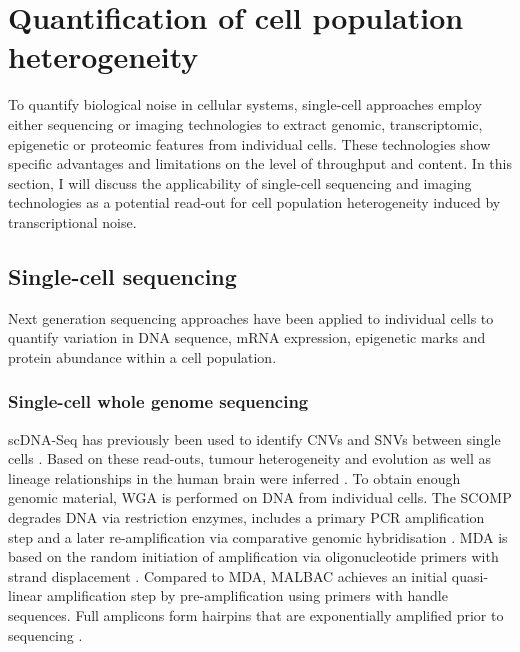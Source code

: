 
\section{Quantification of cell population heterogeneity} 

To quantify biological noise in cellular systems, single-cell approaches employ either sequencing or imaging technologies to extract genomic, transcriptomic, epigenetic or proteomic features from individual cells. These technologies show specific advantages and limitations on the level of throughput and content. 
In this section, I will discuss the applicability of single-cell sequencing and imaging technologies as a potential read-out for cell population heterogeneity induced by transcriptional noise.

\subsection{Single-cell sequencing}

Next generation sequencing approaches have been applied to individual cells to quantify variation in DNA sequence, mRNA expression, epigenetic marks and protein abundance within a cell population. 

\subsubsection{Single-cell whole genome sequencing}

\Gls{scDNA-Seq} has previously been used to identify CNVs and SNVs between single cells \citep{Zong2012}. 
Based on these read-outs, tumour heterogeneity and evolution \citep{Navin2011} as well as lineage relationships in the human brain were inferred \citep{Evrony2015}. 
To obtain enough genomic material, \gls{WGA} is performed on DNA from individual cells. The \gls{SCOMP} degrades DNA via restriction enzymes, includes a primary \gls{PCR} amplification step and a later re-amplification via comparative genomic hybridisation \citep{Klein1999}. \Gls{MDA} is based on the random initiation of amplification via oligonucleotide primers with strand displacement \citep{Dean2002}. Compared to MDA, \gls{MALBAC} achieves an initial quasi-linear amplification step by pre-amplification using primers with handle sequences. 
Full amplicons form hairpins that are exponentially amplified prior to sequencing \citep{Zong2012}. \\

